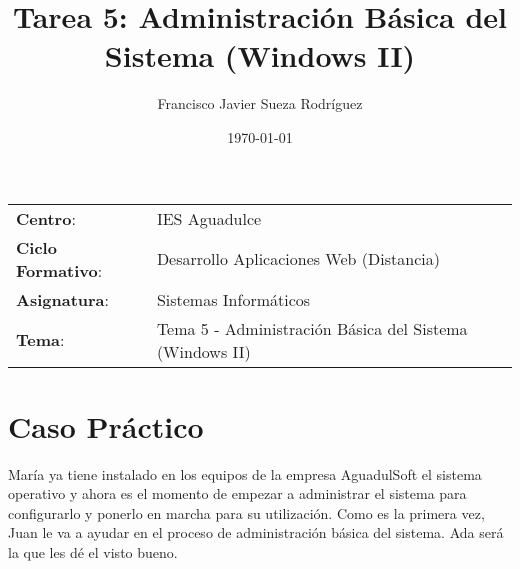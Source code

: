 


\title{
\vspace{10ex}
\normalfont \normalsize
\Huge \textbf{Tarea 5: Administración Básica del Sistema (Windows II)}
}
\author{Francisco Javier Sueza Rodríguez}
\date{\normalsize\today}



\maketitle

\thispagestyle{empty}

\vspace{68ex}

\begin{center}
    \begin{tabular}{l l}
        \textbf{Centro}: & IES Aguadulce \\
        \textbf{Ciclo Formativo}: & Desarrollo Aplicaciones Web (Distancia)\\
        \textbf{Asignatura}: & Sistemas Informáticos\\
        \textbf{Tema}: & Tema 5 -  Administración Básica del Sistema (Windows II)\\
    \end{tabular}
\end{center}

\newpage

\tableofcontents

\newpage

\listoffigures

\newpage

\section{Caso Práctico}
María ya tiene instalado en los equipos de la empresa AguadulSoft el sistema operativo y ahora es el momento de empezar a administrar el sistema para configurarlo y ponerlo en marcha para su utilización. Como es la primera vez, Juan le va a ayudar en el proceso de administración básica del sistema. Ada será la que les dé el visto bueno.

